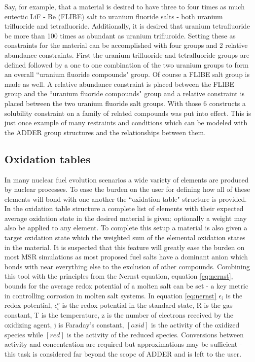 \documentclass[]{elsarticle}
\def\j{\mathfrak{j}}
\begin{document}
Say, for example, that a material is desired to have three to four times as
much eutectic LiF - Be (FLIBE) salt to uranium fluoride salts - both 
uranium trifluoride and tetrafluoride. Additionally, it is desired that uranium
tetrafluoride be more than 100 times as abundant as uranium trifluroide. Setting
these as constraints for the material can be accomplished with four groups and
2 relative abundance constraints. First the uranium trifluoride and tetrafluoride
groups are defined followed by a one to one combination of the two uranium
groups to form an overall ``uranium fluoride compounds" group. Of course a FLIBE
salt group is made as well. A relative abundance constraint is placed between
the FLIBE group and the ``uranium fluoride compounds" group and a relative
constraint is placed between the two uranium fluoride salt groups. With those
6 constructs a solubility constraint on a family of related compounds was put
into effect. This is just once example of many restraints and conditions which
can be modeled with the ADDER group structures and the relationships between
them.

\subsection{Oxidation tables} \label{ssec:oxi}
In many nuclear fuel evolution scenarios a wide variety of elements are
produced by nuclear processes. To ease the burden on the user for
defining how all of these elements will bond with one another the ``oxidation
table" structure is provided. In the oxidation table structure a complete list
of elements with their expected average oxidation state in the desired
material is given; optionally a weight may also be applied to any element. To complete this setup a material is also given a target
oxidation state which the weighted sum of the elemental oxidation states in
the material.
It is suspected that this feature will greatly ease the
burden on most MSR simulations as most proposed fuel salts have a dominant
anion which bonds with near everything else to the exclusion of other
compounds. Combining this tool with the principles from the Nernst equation,
equation \ref{eq:nernst}, bounds for the average redox potential of a molten
salt can be set - a key metric in controlling corrosion in molten salt systems.
In equation \ref{eq:nernst} $\epsilon_{i}$ is the redox potential,
$\epsilon_{i}^{o}$ is the redox potential in the standard state, R is the gas
constant, T is the temperature, z is the number of electrons received by the
oxidizing agent, $\j$ is Faraday's constant, $[oxid]$ is the activity of the oxidized species while $[red]$ is the activity of the reduced species.
Conversions between
activity and concentration are required but approximations may be sufficient -
this task is considered far beyond the scope of ADDER and is left to the user.
\end{document}
